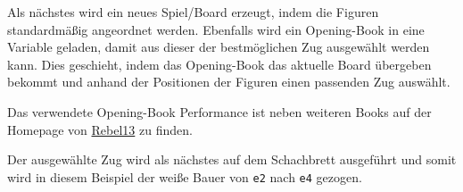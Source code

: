     Als nächstes wird ein neues Spiel/Board erzeugt, indem die Figuren
standardmäßig angeordnet werden. Ebenfalls wird ein Opening-Book in eine
Variable geladen, damit aus dieser der bestmöglichen Zug ausgewählt
werden kann. Dies geschieht, indem das Opening-Book das aktuelle Board
übergeben bekommt und anhand der Positionen der Figuren einen passenden
Zug auswählt.

Das verwendete Opening-Book Performance ist neben weiteren Books auf der Homepage
von \href{http://rebel13.nl/download/books.html}{Rebel13} zu finden.


Der ausgewählte Zug wird als nächstes auf dem Schachbrett ausgeführt und
somit wird in diesem Beispiel der weiße Bauer von \texttt{e2} nach
\texttt{e4} gezogen.

